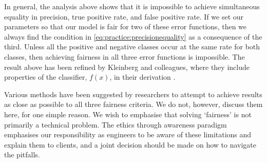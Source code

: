In general, the analysis above shows that it is impossible to achieve simultaneous equality in precision, true positive rate, and false positive rate. If we set our parameters so that our model is fair for two of these error functions, then we always find the condition in \eqref{eq:practice:precisionequality} as a consequence of the third.\vadjust{\pagebreak} Unless all the positive and negative classes occur at the same rate for both classes, then achieving fairness in all three error functions is impossible. The result above has been refined by Kleinberg and colleagues, where they include properties of the classifier, $f(x)$, in their derivation \parencite{kleinberg2018algorithmic}.

Various methods have been suggested by researchers to attempt to achieve results as close as possible to all three fairness criteria. We do not, however, discuss them here, for one simple reason. We wish to emphasise that solving `fairness' is not primarily a technical problem. The ethics through awareness paradigm emphasises our responsibility as engineers to be aware of these limitations and explain them to clients, and a joint decision should be made on how to navigate the pitfalls.


